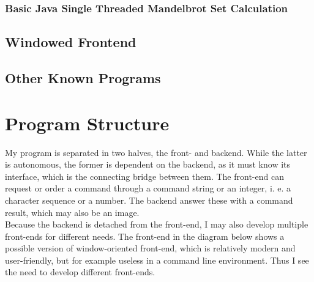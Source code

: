 \documentclass[10pt,a4paper,titlepage]{article}
\begin{document}
	\subsubsection{Basic Java Single Threaded Mandelbrot Set Calculation}
	\subsection{Windowed Frontend}
	\subsection{Other Known Programs}
	
	
	\section{Program Structure}
	
	
	My program is separated in two halves, the front- and backend. While the latter is autonomous, the former is dependent on the backend, as it must know its interface, which is the connecting bridge between them. The front-end can request or order a command through a command string or an integer, i. e. a character sequence or a number. The backend answer these with a command result, which may also be an image.\\
	Because the backend is detached from the front-end, I may also develop multiple front-ends for different needs. The front-end in the diagram below shows a possible version of window-oriented front-end, which is relatively modern and user-friendly, but for example useless in a command line environment. Thus I see the need to develop different front-ends.
	
\end{document}
